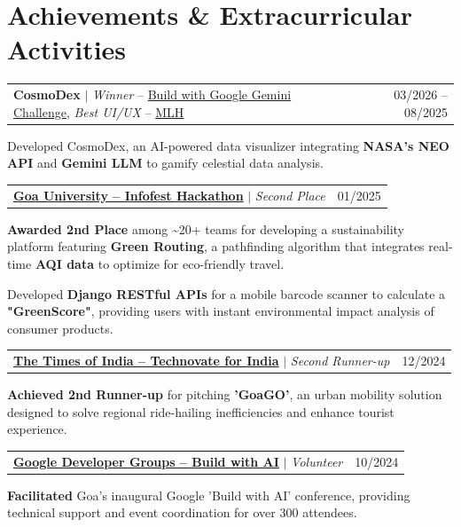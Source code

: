 \documentclass[a4paper, 11pt]{article}
\makeatletter
\newcommand{\resumeProjectHeading}[2]{
  \item
  \begin{tabular*}{1.0\textwidth}[t]{l@{\extracolsep{\fill}}r}
    #1 & #2
  \end{tabular*}
}
\makeatother
\begin{document}
\section{Achievements \& Extracurricular Activities}
\begin{outerlist}
    \resumeProjectHeading
    {\textbf{CosmoDex} $|$ \emph{Winner} -- \href{https://dev.to/deeptej/fusing-nasa-data-with-ai-how-i-built-cosmodex-and-won-the-mlh-data-hackfest-5fmm}{Build with Google Gemini Challenge}, \emph{Best UI/UX} -- \href{https://devpost.com/software/cosmodex}{MLH}}
    {03/2026 -- 08/2025}
    \begin{innerlist}
      \item Developed CosmoDex, an AI-powered data visualizer integrating \textbf{NASA's NEO API} and \textbf{Gemini LLM} to gamify celestial data analysis.
    \end{innerlist}

    \resumeProjectHeading
      {\textbf{\href{https://www.linkedin.com/posts/deeptejdhauskar_hackathon-climatechange-activity-7293620325542432768-Yvrv}{Goa University -- Infofest Hackathon}} $|$ \emph{Second Place}}{01/2025}
    \begin{innerlist}
      \item \textbf{Awarded 2nd Place} among \textasciitilde20+ teams for developing a sustainability platform featuring \textbf{Green Routing}, a pathfinding algorithm that integrates real-time \textbf{AQI data} to optimize for eco-friendly travel.
      \item Developed \textbf{Django RESTful APIs} for a mobile barcode scanner to calculate a \textbf{"GreenScore"}, providing users with instant environmental impact analysis of consumer products.
    \end{innerlist}

    \resumeProjectHeading
      {\textbf{\href{https://timesofindia.indiatimes.com/business/india-business/technovate-goa-empowers-innovators-to-lead-indias-tech-era/articleshow/117115136.cms}{The Times of India -- Technovate for India}} $|$ \emph{Second Runner-up}}{12/2024}
    \begin{innerlist}
      \item \textbf{Achieved 2nd Runner-up} for pitching \textbf{'GoaGO'}, an urban mobility solution designed to solve regional ride-hailing inefficiencies and enhance tourist experience.
    \end{innerlist}

    \resumeProjectHeading
      {\textbf{\href{https://gdg.community.dev/events/details/google-gdg-goa-presents-build-with-ai-goa/}{Google Developer Groups -- Build with AI}} $|$ \emph{Volunteer}}{10/2024}
    \begin{innerlist}
      \item \textbf{Facilitated} Goa's inaugural Google 'Build with AI' conference, providing technical support and event coordination for over 300 attendees.
    \end{innerlist}


\end{outerlist}
\end{document}
